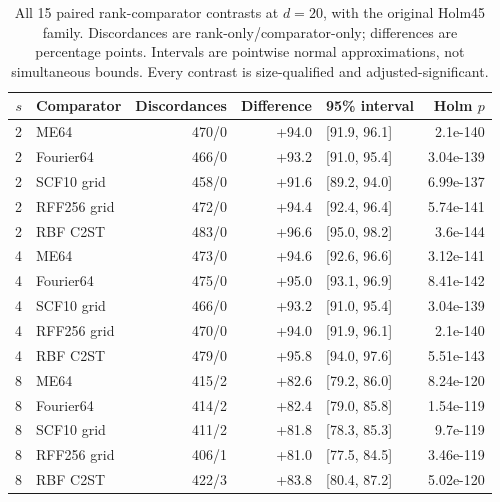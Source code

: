 \begin{table}[t]\centering\scriptsize
\caption{All 15 paired rank-comparator contrasts at $d=20$, with the original Holm45 family. Discordances are rank-only/comparator-only; differences are percentage points. Intervals are pointwise normal approximations, not simultaneous bounds. Every contrast is size-qualified and adjusted-significant.}
\label{tab:axis-paired-d20}
{\setlength{\tabcolsep}{8pt}\renewcommand{\arraystretch}{1.2}
\begin{tabular}{rlrrlr}
\toprule
$s$ & Comparator & Discordances & Difference & 95\% interval & Holm $p$\\
\midrule
2 & ME64 & 470/0 & +94.0 & [91.9, 96.1] & 2.1e-140\\
2 & Fourier64 & 466/0 & +93.2 & [91.0, 95.4] & 3.04e-139\\
2 & SCF10 grid & 458/0 & +91.6 & [89.2, 94.0] & 6.99e-137\\
2 & RFF256 grid & 472/0 & +94.4 & [92.4, 96.4] & 5.74e-141\\
2 & RBF C2ST & 483/0 & +96.6 & [95.0, 98.2] & 3.6e-144\\
4 & ME64 & 473/0 & +94.6 & [92.6, 96.6] & 3.12e-141\\
4 & Fourier64 & 475/0 & +95.0 & [93.1, 96.9] & 8.41e-142\\
4 & SCF10 grid & 466/0 & +93.2 & [91.0, 95.4] & 3.04e-139\\
4 & RFF256 grid & 470/0 & +94.0 & [91.9, 96.1] & 2.1e-140\\
4 & RBF C2ST & 479/0 & +95.8 & [94.0, 97.6] & 5.51e-143\\
8 & ME64 & 415/2 & +82.6 & [79.2, 86.0] & 8.24e-120\\
8 & Fourier64 & 414/2 & +82.4 & [79.0, 85.8] & 1.54e-119\\
8 & SCF10 grid & 411/2 & +81.8 & [78.3, 85.3] & 9.7e-119\\
8 & RFF256 grid & 406/1 & +81.0 & [77.5, 84.5] & 3.46e-119\\
8 & RBF C2ST & 422/3 & +83.8 & [80.4, 87.2] & 5.02e-120\\
\bottomrule
\end{tabular}}
\end{table}

